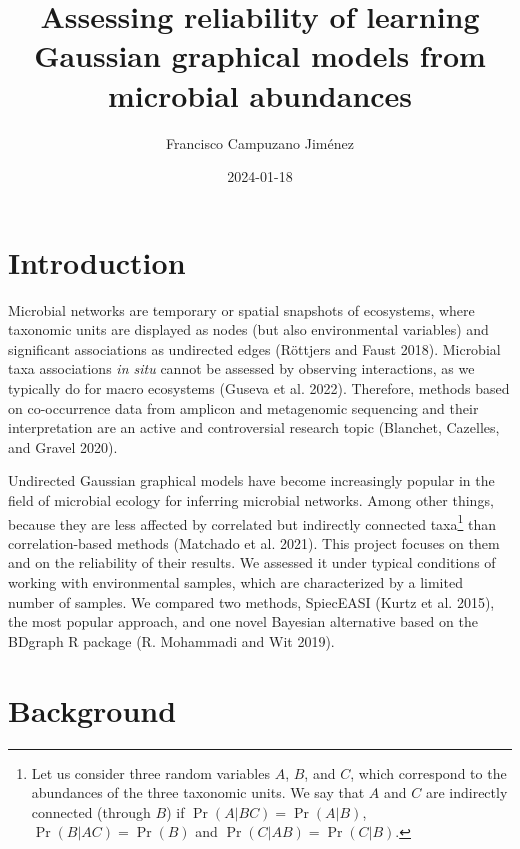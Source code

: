 \documentclass[
  a4paper,
]{article}
\title{Assessing reliability of learning Gaussian graphical models from
microbial abundances}
\author{Francisco Campuzano Jiménez}
\affil{%
                  Bioinformatics Research Centre, Aarhus University
              }
\date{2024-01-18}
\begin{document}
\maketitle
\newpage
\tableofcontents
\newpage\ifdefined\Shaded\renewenvironment{Shaded}{\begin{tcolorbox}[enhanced, boxrule=0pt, frame hidden, breakable, sharp corners, interior hidden, borderline west={3pt}{0pt}{shadecolor}]}{\end{tcolorbox}}\fi

\newpage

\hypertarget{introduction}{%
\section{Introduction}\label{introduction}}

Microbial networks are temporary or spatial snapshots of ecosystems,
where taxonomic units are displayed as nodes (but also environmental
variables) and significant associations as undirected edges (Röttjers
and Faust 2018). Microbial taxa associations \emph{in situ} cannot be
assessed by observing interactions, as we typically do for macro
ecosystems (Guseva et al. 2022). Therefore, methods based on
co-occurrence data from amplicon and metagenomic sequencing and their
interpretation are an active and controversial research topic (Blanchet,
Cazelles, and Gravel 2020).

Undirected Gaussian graphical models have become increasingly popular in
the field of microbial ecology for inferring microbial networks. Among
other things, because they are less affected by correlated but
indirectly connected taxa\footnote{Let us consider three random
  variables \(A\), \(B\), and \(C\), which correspond to the abundances
  of the three taxonomic units. We say that \(A\) and \(C\) are
  indirectly connected (through \(B\)) if \(\Pr(A |BC) = \Pr(A |B)\),
  \(\Pr(B |AC) = \Pr(B)\) and \(\Pr(C |AB) = \Pr(C |B)\).} than
correlation-based methods (Matchado et al. 2021). This project focuses
on them and on the reliability of their results. We assessed it under
typical conditions of working with environmental samples, which are
characterized by a limited number of samples. We compared two methods,
SpiecEASI (Kurtz et al. 2015), the most popular approach, and one novel
Bayesian alternative based on the BDgraph R package (R. Mohammadi and
Wit 2019).

\hypertarget{background}{%
\section{Background}\label{background}}
\end{document}
